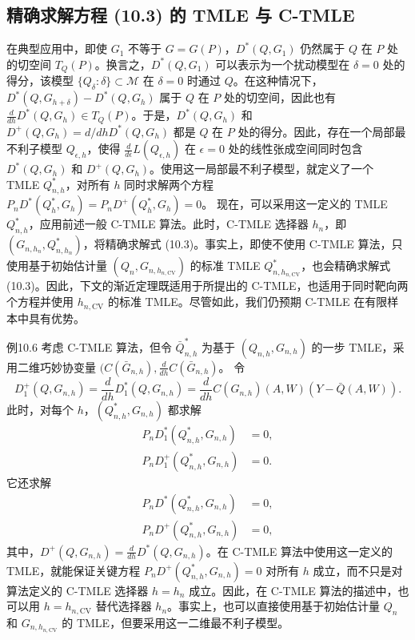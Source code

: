 \subsection{精确求解方程 (10.3) 的 TMLE 与 C-TMLE}
\label{subsec:ch10-exact-score-equations}

在典型应用中，即使 $G_1$ 不等于 $G=G(P)$，$D^*(Q,G_1)$ 仍然属于 $Q$ 在 $P$ 处的切空间 $T_Q(P)$。换言之，$D^*(Q,G_1)$ 可以表示为一个扰动模型在 $\delta=0$ 处的得分，该模型 $\{Q_\delta:\delta\}\subset\mathcal M$ 在 $\delta=0$ 时通过 $Q$。在这种情况下，$D^*(Q,G_{h+\delta})-D^*(Q,G_h)$ 属于 $Q$ 在 $P$ 处的切空间，因此也有 $\frac{d}{dh}D^*(Q,G_h)\in T_Q(P)$。于是，$D^*(Q,G_h)$ 和 $D^+(Q,G_h)=d/dhD^*(Q,G_h)$ 都是 $Q$ 在 $P$ 处的得分。因此，存在一个局部最不利子模型 $Q_{\epsilon,h}$，使得 $\frac{d}{d\epsilon}L(Q_{\epsilon,h})$ 在 $\epsilon=0$ 处的线性张成空间同时包含 $D^*(Q,G_h)$ 和 $D^+(Q,G_h)$。使用这一局部最不利子模型，就定义了一个 TMLE $Q_{n,h}^*$，对所有 $h$ 同时求解两个方程
$P_nD^*(Q_h^*,G_h)=P_nD^+(Q_h^*,G_h)=0$。
现在，可以采用这一定义的 TMLE $Q_{n,h}^*$，应用前述一般 C-TMLE 算法。此时，C-TMLE 选择器 $h_n$，即 $(G_{n,h_n},Q_{n,h_n}^*)$，将精确求解式 (10.3)。事实上，即使不使用 C-TMLE 算法，只使用基于初始估计量 $(Q_n,G_{n,h_{n,\mathrm{CV}}})$ 的标准 TMLE $Q_{n,h_{n,\mathrm{CV}}}^*$，也会精确求解式 (10.3)。因此，下文的渐近定理既适用于所提出的 C-TMLE，也适用于同时靶向两个方程并使用 $h_{n,\mathrm{CV}}$ 的标准 TMLE。尽管如此，我们仍预期 C-TMLE 在有限样本中具有优势。

\begin{bookresult}{例}{10.6}
考虑 C-TMLE 算法，但令 $\bar Q_{n,h}^*$ 为基于 $(Q_{n,h},G_{n,h})$ 的一步 TMLE，采用二维巧妙协变量
$(C(\bar G_{n,h}),\frac{d}{dh}C(\bar G_{n,h})$。
令
\[
 D_1^+(Q,G_{n,h})
 =\frac{d}{dh}D_1^*(Q,G_{n,h})
 =\frac{d}{dh}C(G_{n,h})(A,W)(Y-\bar Q(A,W)).
\]
此时，对每个 $h$，$(Q_{n,h}^*,G_{n,h})$ 都求解
\[
 \begin{aligned}
 P_nD_1^*(Q_{n,h}^*,G_{n,h})&=0,\\
 P_nD_1^+(Q_{n,h}^*,G_{n,h})&=0.
 \end{aligned}
\]
它还求解
\[
 \begin{aligned}
 P_nD^*(Q_{n,h}^*,G_{n,h})&=0,\\
 P_nD^+(Q_{n,h}^*,G_{n,h})&=0,
 \end{aligned}
\]
其中，$D^+(Q,G_{n,h})=\frac{d}{dh}D^*(Q,G_{n,h})$。在 C-TMLE 算法中使用这一定义的 TMLE，就能保证关键方程
$P_nD^+(Q_{n,h}^*,G_{n,h})=0$
对所有 $h$ 成立，而不只是对算法定义的 C-TMLE 选择器 $h=h_n$ 成立。因此，在 C-TMLE 算法的描述中，也可以用 $h=h_{n,\mathrm{CV}}$ 替代选择器 $h_n$。事实上，也可以直接使用基于初始估计量 $Q_n$ 和 $G_{n,h_{n,\mathrm{CV}}}$ 的 TMLE，但要采用这一二维最不利子模型。
\end{bookresult}

